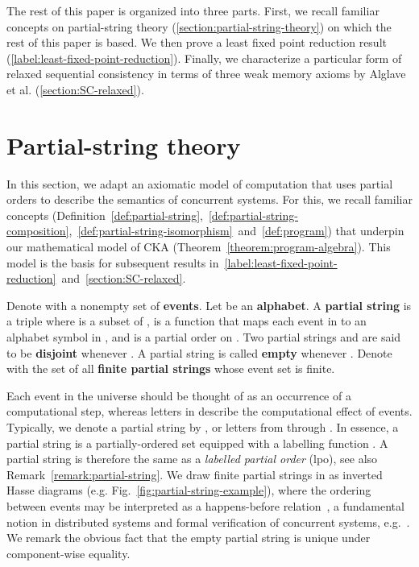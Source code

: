 \documentclass{llncs}
\newcommand{\defn}[1]{\textbf{#1}}
\begin{document}
The rest of this paper is organized into three parts. First, we recall familiar concepts on partial-string theory (\autoref{section:partial-string-theory}) on which the rest of this paper is based. We then prove a least fixed point reduction result (\autoref{label:least-fixed-point-reduction}). Finally, we characterize a particular form of relaxed sequential consistency in terms of three weak memory axioms by Alglave et al. (\autoref{section:SC-relaxed}).

\section{Partial-string theory}
\vspace{-0.3em}
\label{section:partial-string-theory}

In this section, we adapt an axiomatic model of computation that uses partial orders to describe the semantics of concurrent systems. For this, we recall familiar concepts (Definition~\ref{def:partial-string},~\ref{def:partial-string-composition},~\ref{def:partial-string-isomorphism}~and~\ref{def:program}) that underpin our mathematical model of CKA (Theorem~\ref{theorem:program-algebra}). This model is the basis for subsequent results in~\autoref{label:least-fixed-point-reduction}~and~\autoref{section:SC-relaxed}.

\begin{definition}
\label{def:partial-string}
Denote with  a nonempty set of \defn{events}. Let  be an \defn{alphabet}. A \defn{partial string}  is a triple  where  is a subset of ,  is a function that maps each event in  to an alphabet symbol in , and  is a partial order on . Two partial strings  and  are said to be \defn{disjoint} whenever . A partial string  is called \defn{empty} whenever . Denote with  the set of all \defn{finite partial strings}  whose event set  is finite.
\end{definition}

Each event in the universe  should be thought of as an occurrence of a computational step, whereas letters in  describe the computational effect of events. Typically, we denote a partial string by , or letters from  through . In essence, a partial string  is a partially-ordered set  equipped with a labelling function . A partial string is therefore the same as a \emph{labelled partial order} (lpo), see also Remark~\ref{remark:partial-string}. We draw finite partial strings in  as inverted Hasse diagrams (e.g. Fig.~\ref{fig:partial-string-example}), where the ordering between events may be interpreted as a happens-before relation~\cite{L1978}, a fundamental notion in distributed systems and formal verification of concurrent systems, e.g.~\cite{BOSSW2011,AMSS2012}. We remark the obvious fact that the empty partial string is unique under component-wise equality.
\end{document}

